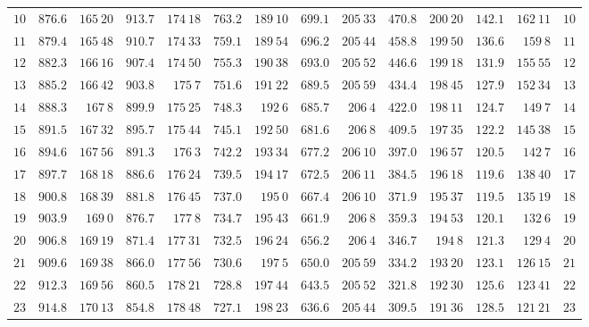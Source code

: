 \begin{center}
\begin{tabular}{r|r|r|r|r|r|r|r|r|r|r|r|r|r}
$10$ & $876.6$ & $165\ 20$ & $913.7$ & $174\ 18$ & $763.2$ & $189\ 10$ & $699.1$ & $205\ 33$ & $470.8$ & $200\ 20$ & $142.1$ & $162\ 11$ & $10$ \\[3pt]
$11$ & $879.4$ & $165\ 48$ & $910.7$ & $174\ 33$ & $759.1$ & $189\ 54$ & $696.2$ & $205\ 44$ & $458.8$ & $199\ 50$ & $136.6$ & $159\ 8$ & $11$ \\
$12$ & $882.3$ & $166\ 16$ & $907.4$ & $174\ 50$ & $755.3$ & $190\ 38$ & $693.0$ & $205\ 52$ & $446.6$ & $199\ 18$ & $131.9$ & $155\ 55$ & $12$ \\
$13$ & $885.2$ & $166\ 42$ & $903.8$ & $175\ 7$ & $751.6$ & $191\ 22$ & $689.5$ & $205\ 59$ & $434.4$ & $198\ 45$ & $127.9$ & $152\ 34$ & $13$ \\
$14$ & $888.3$ & $167\ 8$ & $899.9$ & $175\ 25$ & $748.3$ & $192\ 6$ & $685.7$ & $206\ 4$ & $422.0$ & $198\ 11$ & $124.7$ & $149\ 7$ & $14$ \\
$15$ & $891.5$ & $167\ 32$ & $895.7$ & $175\ 44$ & $745.1$ & $192\ 50$ & $681.6$ & $206\ 8$ & $409.5$ & $197\ 35$ & $122.2$ & $145\ 38$ & $15$ \\[3pt]
$16$ & $894.6$ & $167\ 56$ & $891.3$ & $176\ 3$ & $742.2$ & $193\ 34$ & $677.2$ & $206\ 10$ & $397.0$ & $196\ 57$ & $120.5$ & $142\ 7$ & $16$ \\
$17$ & $897.7$ & $168\ 18$ & $886.6$ & $176\ 24$ & $739.5$ & $194\ 17$ & $672.5$ & $206\ 11$ & $384.5$ & $196\ 18$ & $119.6$ & $138\ 40$ & $17$ \\
$18$ & $900.8$ & $168\ 39$ & $881.8$ & $176\ 45$ & $737.0$ & $195\ 0$ & $667.4$ & $206\ 10$ & $371.9$ & $195\ 37$ & $119.5$ & $135\ 19$ & $18$ \\
$19$ & $903.9$ & $169\ 0$ & $876.7$ & $177\ 8$ & $734.7$ & $195\ 43$ & $661.9$ & $206\ 8$ & $359.3$ & $194\ 53$ & $120.1$ & $132\ 6$ & $19$ \\
$20$ & $906.8$ & $169\ 19$ & $871.4$ & $177\ 31$ & $732.5$ & $196\ 24$ & $656.2$ & $206\ 4$ & $346.7$ & $194\ 8$ & $121.3$ & $129\ 4$ & $20$ \\[3pt]
$21$ & $909.6$ & $169\ 38$ & $866.0$ & $177\ 56$ & $730.6$ & $197\ 5$ & $650.0$ & $205\ 59$ & $334.2$ & $193\ 20$ & $123.1$ & $126\ 15$ & $21$ \\
$22$ & $912.3$ & $169\ 56$ & $860.5$ & $178\ 21$ & $728.8$ & $197\ 44$ & $643.5$ & $205\ 52$ & $321.8$ & $192\ 30$ & $125.6$ & $123\ 41$ & $22$ \\
$23$ & $914.8$ & $170\ 13$ & $854.8$ & $178\ 48$ & $727.1$ & $198\ 23$ & $636.6$ & $205\ 44$ & $309.5$ & $191\ 36$ & $128.5$ & $121\ 21$ & $23$ \\

\end{tabular}
\end{center}
